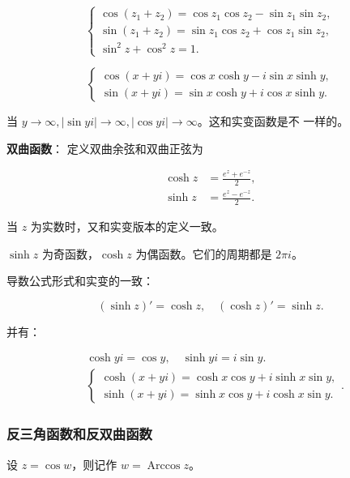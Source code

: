 \begin{equation*}
\begin{cases}
\cos(z_{1}+z_{2})=\cos z_{1}\cos z_{2}-\sin z_{1}\sin z_{2}, \\
\sin(z_{1}+z_{2})=\sin z_{1}\cos z_{2}+\cos z_{1}\sin z_{2}, \\
\sin^{2}z+\cos^{2}z=1.
\end{cases}
\end{equation*}

\begin{equation*}
\begin{cases}
\cos(x+y i)=\cos x\cosh y-i\sin x\sinh y, \\
\sin(x+y i)=\sin x\cosh y+i\cos x\sinh y.
\end{cases}
\end{equation*}

当 \(y \to \infty,|\sin yi| \to \infty,|\cos yi| \to \infty\)。这和实变函数是不
一样的。

\textbf{双曲函数}： 定义双曲余弦和双曲正弦为

\begin{equation*}
\begin{aligned}
    \cosh z &= \frac{e^z+e^{-z}}{2},\\
    \sinh z &= \frac{e^z-e^{-z}}{2}.
\end{aligned}
\end{equation*}

当 \(z\) 为实数时，又和实变版本的定义一致。

\(\sinh z\) 为奇函数，\(\cosh z\) 为偶函数。它们的周期都是 \(2\pi i\)。

导数公式形式和实变的一致：

\[
(\sinh z)'=\cosh z,\quad (\cosh z)'=\sinh z.
\]

并有：

\begin{equation*}
\begin{aligned}
    &\cosh y i=\cos y,\quad
    \sinh y i=i \sin y. \\
    &\begin{cases}
        \cosh (x+yi)=\cosh x \cos y+i \sinh x \sin y, \\
        \sinh (x+yi)=\sinh x \cos y+i \cosh x \sin y.
    \end{cases}.
\end{aligned}
\end{equation*}
\subsubsection{反三角函数和反双曲函数}
\label{反三角函数和反双曲函数}
设 \(z=\cos w\)，则记作 \(w=\operatorname{Arccos} z\)。

